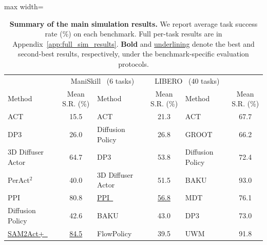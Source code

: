\begin{table}[t]
    \vspace{-10pt}
    \centering
    \caption{\textbf{Summary of the main simulation results.}
    We report average task success rate (\%) on each benchmark.
    Full per-task results are in Appendix~\ref{app:full_sim_results}.
    \textbf{Bold} and \underline{underlining} denote the best and second-best
    results, respectively, under the benchmark-specific evaluation protocols.}
    \label{tab:main_results_summary}
    \vspace{2pt}
    \small
    \setlength{\tabcolsep}{6pt}
    \begin{adjustbox}{max width=\textwidth}
    \begin{tabular}{lc|lc|lc}
        \toprule
        \rowcolor{tablehead}
        \multicolumn{2}{c|}{RLBench2~\citep{James2020RLBench} (7 tasks)} &
        \multicolumn{2}{c|}{ManiSkill~\citep{Gu2023ManiSkill2} (6 tasks)} &
        \multicolumn{2}{c}{LIBERO~\citep{liu2023libero} (40 tasks)} \\
        \rowcolor{tablehead}
        Method & Mean S.R. (\%) & Method & Mean S.R. (\%) & Method & Mean S.R. (\%) \\
        \midrule
        ACT~\citep{Zhao2023Learning} & 15.5 &
        ACT~\citep{Zhao2023Learning} & 21.3 &
        ACT~\citep{Zhao2023Learning} & 67.7 \\
        DP3~\citep{Ze2024DP3} & 26.0 &
        Diffusion Policy~\citep{chi2024diffusionpolicy} & 26.8 &
        GROOT~\citep{zhu2023learning} & 66.2 \\
        3D Diffuser Actor~\citep{ke2024diffuseractor} & 64.7 &
        DP3~\citep{Ze2024DP3} & 53.8 &
        Diffusion Policy~\citep{chi2024diffusionpolicy} & 72.4 \\
        PerAct$^2$~\citep{shridhar2022peract} & 40.0 &
        3D Diffuser Actor~\citep{ke2024diffuseractor} & 51.5 &
        BAKU~\citep{Haldar2025BAKU} & 93.0 \\
        PPI~\citep{Yang2025PPI} & 80.8 &
        \underline{PPI~\citep{Yang2025PPI}} & \underline{56.8} &
        MDT~\citep{reuss2024multimodal} & 76.1 \\
        Diffusion Policy~\citep{chi2024diffusionpolicy} & 42.6 &
        BAKU~\citep{Haldar2025BAKU} & 43.0 &
        DP3~\citep{Ze2024DP3} & 73.0 \\
        \underline{SAM2Act+~\citep{Fang2025SAM2Act}} & \underline{84.5} &
        FlowPolicy~\citep{zhang2024flowpolicy} & 39.5 &
        UWM~\citep{Zhu2025UWM} & 91.8 \\

\end{tabular}
\end{adjustbox}
\end{table}
